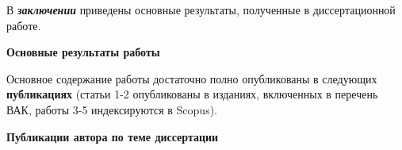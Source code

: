 В \textbf{\textit{заключении}} приведены основные результаты, полученные в диссертационной работе.
\begin{center}
    \large\bf Основные результаты работы
\end{center}




\renewcommand*{\refname}{\vspace*{-13mm}}
Основное содержание работы достаточно полно опубликованы в следующих \textbf{публикациях} (статьи 1-2 опубликованы в изданиях, включенных в перечень ВАК, работы 3-5 индексируются в Scopus).
\begin{center}
    \large\bf Публикации автора по теме диссертации
\end{center}
\nocite{*}
\insertbiblioauthor                          %
